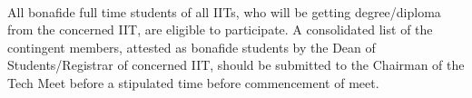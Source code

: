 \paragraph{}
All bonafide full time students of all IITs, who will be getting degree/diploma from the concerned IIT, are eligible to participate. A consolidated list of the contingent members, attested as bonafide students by the Dean of Students/Registrar of concerned IIT, should be submitted to the Chairman of the Tech Meet before a stipulated time before commencement of meet.
